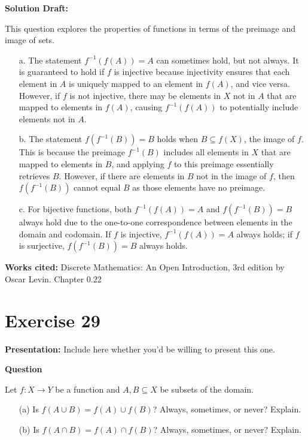 \documentclass{article}
\begin{document}
\noindent\textbf{Solution Draft:} 

This question explores the properties of functions in terms of the preimage and image of sets.

\begin{enumerate}
    \item[a.]
The statement \( f^{-1}(f(A)) = A \) can sometimes hold, but not always. It is guaranteed to hold if \( f \) is injective because injectivity ensures that each element in \( A \) is uniquely mapped to an element in \( f(A) \), and vice versa. However, if \( f \) is not injective, there may be elements in \( X \) not in \( A \) that are mapped to elements in \( f(A) \), causing \( f^{-1}(f(A)) \) to potentially include elements not in \( A \).

\item[b.]
The statement \( f(f^{-1}(B)) = B \) holds when \( B \subseteq f(X) \), the image of \( f \). This is because the preimage \( f^{-1}(B) \) includes all elements in \( X \) that are mapped to elements in \( B \), and applying \( f \) to this preimage essentially retrieves \( B \). However, if there are elements in \( B \) not in the image of \( f \), then \( f(f^{-1}(B)) \) cannot equal \( B \) as those elements have no preimage.

\item[c.]
For bijective functions, both \( f^{-1}(f(A)) = A \) and \( f(f^{-1}(B)) = B \) always hold due to the one-to-one correspondence between elements in the domain and codomain. If \( f \) is injective, \( f^{-1}(f(A)) = A \) always holds; if \( f \) is surjective, \( f(f^{-1}(B)) = B \) always holds.
\end{enumerate}
\vspace{0.5cm}
\textbf{Works cited:}
Discrete Mathematics: An Open Introduction, 3rd edition by Oscar Levin. Chapter 0.22
\section*{Exercise 29}  

\noindent\textbf{Presentation:} Include here whether you'd be willing to present this one. 

\vspace{0.5cm} %

\noindent\textbf{Question}

Let \( f : X \to Y \) be a function and \( A, B \subseteq X \) be subsets of the domain.
\begin{enumerate}
    \item[(a)] Is \( f(A \cup B) = f(A) \cup f(B) \)? Always, sometimes, or never? Explain.
    \item[(b)] Is \( f(A \cap B) = f(A) \cap f(B) \)? Always, sometimes, or never? Explain.
\end{enumerate}
\end{document}
